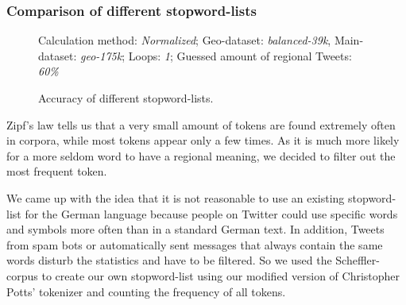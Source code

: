 \documentclass[../Main.tex]{subfiles}
\begin{document}
\subsubsection{Comparison of different stopword-lists}
\begin{figure}
\begin{center}
\end{center}
  \label{geo_graph1}
Calculation method: \textit{Normalized}; Geo-dataset: \textit{balanced-39k}, Main-dataset: \textit{geo-175k}; Loops: \textit{1}; Guessed amount of regional Tweets: \textit{60\%}
  \caption{Accuracy of different stopword-lists.}

\end{figure}

Zipf's law tells us that a very small amount of tokens are found extremely often in corpora, while most tokens appear only a few times. As it is much more likely for a more seldom word to have a regional meaning, we decided to filter out the most frequent token. 

We came up with the idea that it is not reasonable to use an existing stopword-list for the German language because people on Twitter could use specific words and symbols more often than in a standard German text. In addition, Tweets from spam bots or automatically sent messages that always contain the same words disturb the statistics and have to be filtered. So we used the Scheffler-corpus to create our own stopword-list using our modified version of Christopher Potts' tokenizer and counting the frequency of all tokens.
\end{document}
